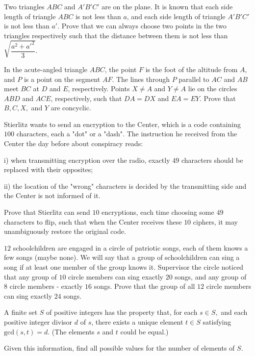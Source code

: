 \documentclass[11pt]{scrartcl}
\begin{document}
\begin{problem}[3838489129977355762]
Two triangles $ABC$ and $A'B'C'$ are on the plane. It is known that each side length of triangle $ABC$ is not less than $a$, and each side length of triangle $A'B'C'$ is not less than $a'$. Prove that we can always choose two points in the two triangles respectively such that the distance between them is not less than $\sqrt{\dfrac{a^2+a'^2}{3}}$.
\end{problem}
\begin{problem}[5873161915777778529]
In the acute-angled triangle $ABC$, the point $F$ is the foot of the altitude from $A$, and $P$ is a point on the segment $AF$. The lines through $P$ parallel to $AC$ and $AB$ meet $BC$ at $D$ and $E$, respectively. Points $X \ne A$ and $Y \ne A$ lie on the circles $ABD$ and $ACE$, respectively, such that $DA = DX$ and $EA = EY$.
Prove that $B, C, X,$ and $Y$ are concyclic.
\end{problem}
\begin{problem}[966139221944695]
Stierlitz wants to send an encryption to the Center, which is a code containing $100$ characters, each a "dot" or a "dash". The instruction he received from the Center the day before about conspiracy reads:

i) when transmitting encryption over the radio, exactly $49$ characters should be replaced with their opposites;

ii) the location of the "wrong" characters is decided by the transmitting side and the Center is not informed of it.

Prove that Stierlitz can send $10$ encryptions, each time choosing some $49$ characters to flip, such that when the Center receives these $10$ ciphers, it may unambiguously restore the original code.
\end{problem}
\begin{problem}[8024569764169071557]
$12$ schoolchildren are engaged in a circle of patriotic songs, each of them knows a few songs (maybe none). We will say that a group of schoolchildren can sing a song if at least one member of the group knows it. Supervisor the circle noticed that any group of $10$ circle members can sing exactly $20$ songs, and any group of $8$ circle members - exactly $16$ songs. Prove that the group of all $12$ circle members can sing exactly $24$ songs.
\end{problem}
\begin{problem}[770421031902562]
A finite set $S$ of positive integers has the property that, for each $s \in S,$ and each positive integer divisor $d$ of $s$, there exists a unique element $t \in S$ satisfying $\text{gcd}(s, t) = d$. (The elements $s$ and $t$ could be equal.)

Given this information, find all possible values for the number of elements of $S$.
\end{problem}
\end{document}
